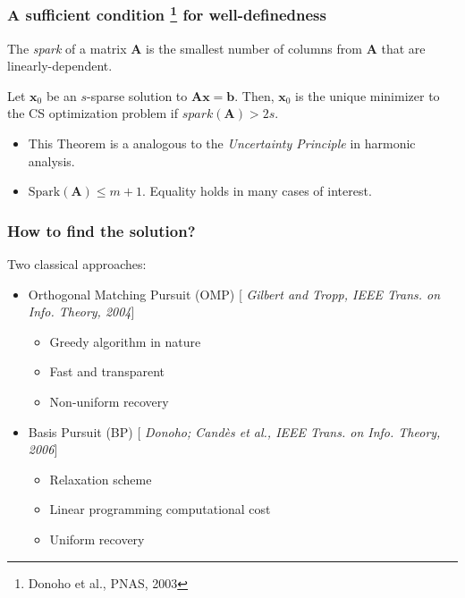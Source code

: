 \documentclass[11pt]{beamer}
\def\A{{\mathbf A}}
\def\x{{\mathbf x}}
\def\b{{\mathbf b}}
\begin{document}
\begin{frame}
\frametitle{A sufficient condition \footnote{Donoho et al., PNAS, 2003} for well-definedness}

\begin{Definition}
The \emph{spark} of a matrix $\A$ is the smallest number of columns from $\A$ that are linearly-dependent. 
\end{Definition}

\medskip

\begin{Theorem}
Let $\x_0$ be an $s$-sparse solution to $\A\x=\b$. Then, $\x_0$ is the unique minimizer to the CS optimization problem if $spark(\A)>2s$. 
\end{Theorem}

\medskip

\begin{itemize}
\item This Theorem is a analogous to the \emph{Uncertainty Principle} in harmonic analysis.
\item $\text{Spark}(\A)\leq m+1$. Equality holds in many cases of interest.  
\end{itemize} 

\end{frame}



\begin{frame}
\frametitle{How to find the solution?}

Two classical approaches:

\begin{itemize}
\item Orthogonal Matching Pursuit (OMP)
[{\color{blue} \it Gilbert and Tropp, IEEE Trans. on Info. Theory, 2004}]

\begin{itemize}
\item Greedy algorithm in nature
\item Fast and transparent
\item Non-uniform recovery
\end{itemize}  

\medskip

\item Basis Pursuit (BP) [{\color{blue} \it Donoho; \it Cand\`es et al., IEEE Trans. on Info. Theory, 2006}]
\begin{itemize}
\item Relaxation scheme
\item Linear programming computational cost
\item Uniform recovery
\end{itemize} 
\end{itemize}



\end{frame}
\end{document}
